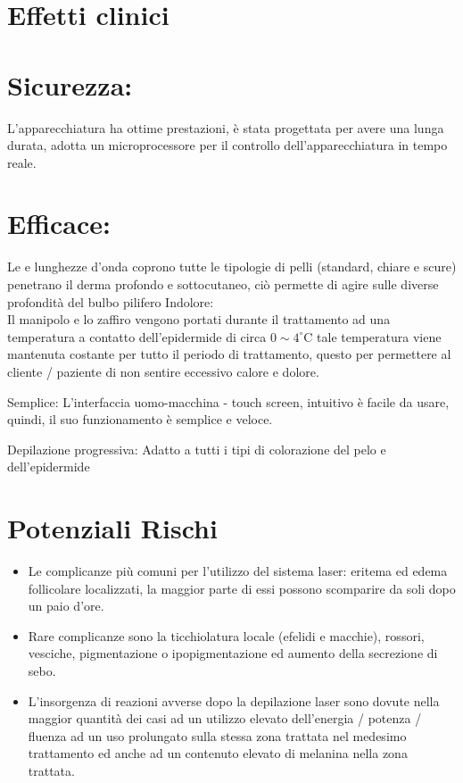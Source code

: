 \documentclass[10pt]{article}
\begin{document}
\section{Effetti clinici}
\section{Sicurezza:}
L'apparecchiatura ha ottime prestazioni, è stata progettata per avere una lunga durata, adotta un microprocessore per il controllo dell'apparecchiatura in tempo reale.

\section{Efficace:}
Le e lunghezze d'onda coprono tutte le tipologie di pelli (standard, chiare e scure) penetrano il derma profondo e sottocutaneo, ciò permette di agire sulle diverse profondità del bulbo pilifero Indolore:\\
Il manipolo e lo zaffiro vengono portati durante il trattamento ad una temperatura a contatto dell'epidermide di circa $0 \sim 4^{\circ} \mathrm{C}$ tale temperatura viene mantenuta costante per tutto il periodo di trattamento, questo per permettere al cliente / paziente di non sentire eccessivo calore e dolore.

Semplice: L'interfaccia uomo-macchina - touch screen, intuitivo è facile da usare, quindi, il suo funzionamento è semplice e veloce.

Depilazione progressiva: Adatto a tutti i tipi di colorazione del pelo e dell'epidermide

\section{Potenziali Rischi}
\begin{itemize}
  \item Le complicanze più comuni per l'utilizzo del sistema laser: eritema ed edema follicolare localizzati, la maggior parte di essi possono scomparire da soli dopo un paio d'ore.
  \item Rare complicanze sono la ticchiolatura locale (efelidi e macchie), rossori, vesciche, pigmentazione o ipopigmentazione ed aumento della secrezione di sebo.
  \item L'insorgenza di reazioni avverse dopo la depilazione laser sono dovute nella maggior quantità dei casi ad un utilizzo elevato dell'energia / potenza / fluenza ad un uso prolungato sulla stessa zona trattata nel medesimo trattamento ed anche ad un contenuto elevato di melanina nella zona trattata.
\end{itemize}
\end{document}
